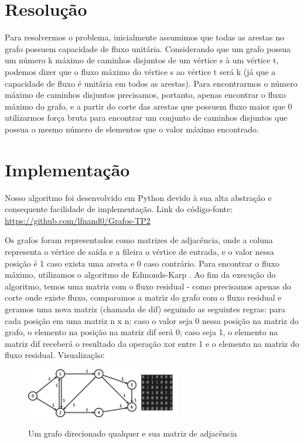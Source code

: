 \section{\esp Resolução}
Para resolvermos o problema, inicialmente assumimos que todas as arestas no grafo possuem capacidade de fluxo unitária. Considerando que um grafo possua um número k máximo de caminhos disjuntos de um vértice s à um vértice t, podemos dizer que o fluxo máximo do vértice s ao vértice t será k (já que a capacidade de fluxo é unitária em todos as arestas). \cite{disjoint} Para encontrarmos o número máximo de caminhos disjuntos precisamos, portanto, apenas encontrar o fluxo máximo do grafo, e a partir do corte das arestas que possuem fluxo maior que 0 utilizarmos força bruta para encontrar um conjunto de caminhos disjuntos que possua o mesmo número de elementos que o valor máximo encontrado.

\section{\esp Implementação}

Nosso algoritmo foi desenvolvido em Python devido à sua alta abstração e consequente facilidade de implementação. Link do código-fonte: \url{https://github.com/lfnand0/Grafos-TP2}

Os grafos foram representados como matrizes de adjacência, onde a coluna representa o vértice de saída e a fileira o vértice de entrada, e o valor nessa posição é 1 caso exista uma aresta e 0 caso contrário.
Para encontrar o fluxo máximo, utilizamos o algoritmo de Edmonds-Karp \cite{10.5555/2168303}. Ao fim da execução do algoritmo, temos uma matriz com o fluxo residual - como precisamos apenas do corte onde existe fluxo, comparamos a matriz do grafo com o fluxo residual e geramos uma nova matriz (chamada de dif) seguindo as seguintes regras: para cada posição em uma matriz n x n: caso o valor seja 0 nessa posição na matriz do grafo, o elemento na posição na matriz dif será 0; caso seja 1, o elemento na matriz dif receberá o resultado da operação xor entre 1 e o elemento na matriz do fluxo residual. Visualização:

\begin{figure}[ht]
	\centering	
	\caption[\hspace{0.1cm}Grafo.]{Um grafo direcionado qualquer e sua matriz de adjacência}
	\vspace{-0.4cm}
	\includegraphics[width=0.6\textwidth]{figuras/grafo.png}
	 \vspace{-0.2cm}
	\label{fig:figura1}
\end{figure}
\vspace{-0.5cm}

